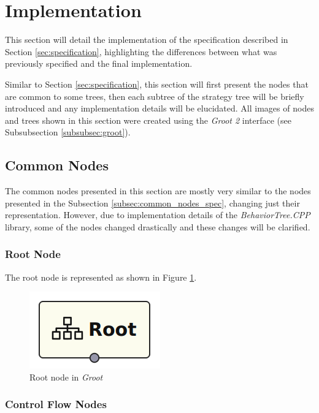 \section{Implementation}
\label{sec:implementation}

This section will detail the implementation of the specification described in Section \ref{sec:specification}, highlighting the differences between what was previously specified and the final implementation.

Similar to Section \ref{sec:specification}, this section will first present the nodes that are common to some trees, then each subtree of the strategy tree will be briefly introduced and any implementation details will be elucidated. All images of nodes and trees shown in this section were created using the \textit{Groot 2} interface (see Subsubsection \ref{subsubsec:groot}).

\subsection{Common Nodes}
\label{subsec:common_nodes_impl}

The common nodes presented in this section are mostly very similar to the nodes presented in the Subsection \ref{subsec:common_nodes_spec}, changing just their representation. However, due to implementation details of the \textit{BehaviorTree.CPP} library, some of the nodes changed drastically and these changes will be clarified.

\subsubsection{Root Node}

The root node is represented as shown in Figure \ref{fig:root_node_impl}.

\begin{figure}[!h]
    \centering
    \includegraphics[width=0.15\linewidth]{chapters/development/images/RootNode.png}
    \caption{Root node in \textit{Groot}}
    \label{fig:root_node_impl}
\end{figure}

\subsubsection{Control Flow Nodes}

